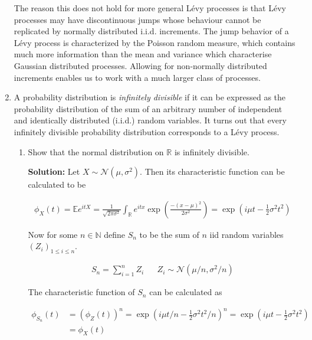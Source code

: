 \documentclass[12pt, a4paper]{article}
\begin{document}
\begin{enumerate}
        The reason this does not hold for more general Lévy processes is that Lévy processes may have discontinuous jumps whose behaviour cannot be replicated by normally distributed i.i.d. increments. The jump behavior of a Lévy process is characterized by the Poisson random measure, which contains much more information than the mean and variance which characterise Gaussian distributed processes. Allowing for non-normally distributed increments enables us to work with a much larger class of processes.

        \item A probability distribution is \textit{infinitely divisible} if it can be expressed as the probability distribution of the sum of an arbitrary number of independent and identically distributed (i.i.d.) random variables. It turns out that every infinitely divisible probability distribution corresponds to a Lévy process.
        
        \begin{enumerate}
            \item Show that the normal distribution on $\mathbb R$ is infinitely divisible.
            
            \textbf{Solution:} Let $X \sim \mathcal N(\mu, \sigma^2)$. Then its characteristic function can be calculated to be 

            \begin{align*}
                \phi_X(t) = \mathbb E e^{itX} = \frac{1}{\sqrt{2\pi \sigma^2}}\int_{\mathbb R} e^{itx} \exp\left(\frac{-(x-\mu)^2}{2\sigma^2}\right) = \exp\left( i\mu t - \frac{1}{2} \sigma^2 t^2 \right)
            \end{align*}

            Now for some $n \in \mathbb N$ define $S_n$ to be the sum of $n$ iid random variables $(Z_i)_{1 \le i \le n}$.

            \begin{align*}
                S_n = \sum_{i=1}^n Z_i && Z_i \sim \mathcal N (\mu/n, \sigma^2/n)
            \end{align*}

            The characteristic function of $S_n$ can be calculated as 

            \begin{align*}
                \phi_{S_n}(t) &= \left(\phi_{Z}(t) \right)^n =  \exp\left( i\mu t/n - \frac{1}{2} \sigma^2 t^2/n \right)^n = \exp\left( i\mu t - \frac{1}{2} \sigma^2 t^2 \right)\\
                &= \phi_X(t)
            \end{align*}


\end{enumerate}
\end{enumerate}
\end{document}
